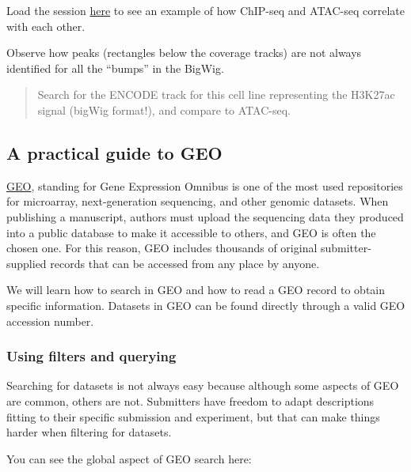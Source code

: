 \documentclass[
]{book}
\begin{document}
Load the session \href{IGV_sessions/ExampleATAC_ChIP_CTCF_hg38.json}{here} to see an example of how ChIP-seq and ATAC-seq correlate with each other.

Observe how peaks (rectangles below the coverage tracks) are not always identified for all the ``bumps'' in the BigWig.

\begin{quote}
Search for the ENCODE track for this cell line representing the H3K27ac signal (bigWig format!), and compare to ATAC-seq.
\end{quote}

\hypertarget{a-practical-guide-to-geo}{%
\subsection{A practical guide to GEO}\label{a-practical-guide-to-geo}}

\href{https://www.ncbi.nlm.nih.gov/gds/}{GEO}, standing for Gene Expression Omnibus is one of the most used repositories for microarray, next-generation sequencing, and other genomic datasets. When publishing a manuscript, authors must upload the sequencing data they produced into a public database to make it accessible to others, and GEO is often the chosen one. For this reason, GEO includes thousands of original submitter-supplied records that can be accessed from any place by anyone.

We will learn how to search in GEO and how to read a GEO record to obtain specific information.
Datasets in GEO can be found directly through a valid GEO accession number.

\hypertarget{using-filters-and-querying}{%
\subsubsection{Using filters and querying}\label{using-filters-and-querying}}

Searching for datasets is not always easy because although some aspects of GEO are common, others are not. Submitters have freedom to adapt descriptions fitting to their specific submission and experiment, but that can make things harder when filtering for datasets.

You can see the global aspect of GEO search here:
\end{document}
